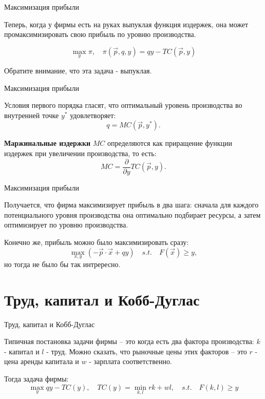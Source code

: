 \documentclass{beamer}
\begin{document}
\begin{frame}{Максимизация прибыли}

Теперь, когда у фирмы есть на руках выпуклая функция издержек, она может промаксимизировать свою прибыль по уровню производства.

$$ \max_{y} \pi, \quad \pi(\vec p, q, y) = q y - TC(\vec p, y)$$

Обратите внимание, что эта задача - выпуклая.

\end{frame}

\begin{frame}{Максимизация прибыли}

Условия первого порядка гласят, что оптимальный уровень производства во внутренней точке $y^{\ast}$ удовлетворяет:
$$ q = MC(\vec p, y^{\ast}).$$

\begin{definition}
\textbf{Маржинальные издержки} $MC$ определяются как приращение функции издержек при увеличении производства, то есть: 
$$ MC = \frac{\partial}{\partial y} TC(\vec p, y).$$
\end{definition}

\end{frame}

\begin{frame}{Максимизация прибыли}

Получается, что фирма максимизирует прибыль в два шага: сначала для каждого потенциального уровня производства она оптимально подбирает ресурсы, а затем оптимизирует по уровню производства. 

Конечно же, прибыль можно было максимизировать сразу:
$$ \max_{x,y} (- \vec p \cdot \vec x + q y) \quad s.t. \quad F(\vec x)  \geqslant y,$$
но тогда не было бы так интрересно.

\end{frame}

\section{Труд, капитал и Кобб-Дуглас}

\begin{frame}{Труд, капитал и Кобб-Дуглас}

Типичная постановка задачи фирмы – это когда есть два фактора производства: $k$ - капитал и $l$ - труд. Можно сказать, что рыночные цены этих факторов – это $r$ - цена аренды капитала и $w$ - зарплата соответственно. 

Тогда задача фирмы:
$$ \max_y q y - TC(y), \quad TC(y) = \min_{k,l} rk + wl, \quad s.t. \quad F(k,l) \geqslant y$$

\end{frame}
\end{document}

